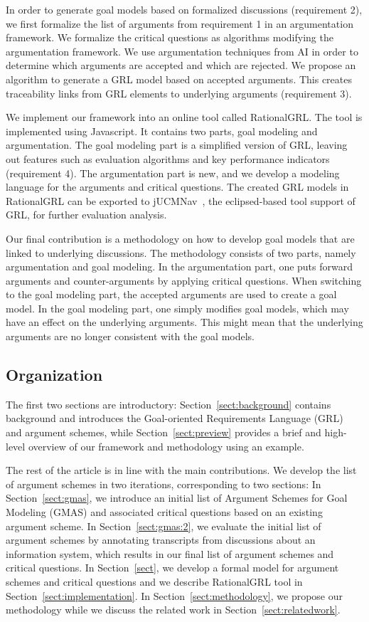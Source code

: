 \documentclass[11.5pt,two column]{llncs}
\begin{document}
In order to generate goal models based on formalized discussions (requirement 2), we first formalize the list of arguments from requirement 1 in an argumentation framework. We formalize the critical questions as algorithms modifying the argumentation framework. We use argumentation techniques from AI in order to determine which arguments are accepted and which are rejected. We propose an algorithm to generate a GRL model based on accepted arguments. This creates traceability links from GRL elements to underlying arguments (requirement 3).

We implement our framework into an online tool called RationalGRL. The tool is implemented using Javascript. It contains  two parts, goal modeling and argumentation. The goal modeling part is a simplified version of GRL, leaving out features such as evaluation algorithms and key performance indicators (requirement 4). The argumentation part is new, and we develop a modeling language for the arguments and critical questions. %
The created GRL models in RationalGRL can be exported to jUCMNav~\cite{}, the eclipsed-based tool support of GRL, for further evaluation analysis. 

Our final contribution is a methodology on how to develop goal models that are linked to underlying discussions. The methodology consists of two parts, namely argumentation and goal modeling. In the argumentation part, one puts forward arguments and counter-arguments by applying critical questions. When switching to the goal modeling part, the accepted arguments are used to create a goal model. In the goal modeling part, one simply modifies goal models, which may have an effect on the underlying arguments. This might mean that the underlying arguments are no longer consistent with the goal models.

\subsection{Organization}

The first two sections are introductory: Section~\ref{sect:background} contains background and introduces the Goal-oriented Requirements Language (GRL)~\cite{} and argument schemes, while Section~\ref{sect:preview} provides a brief and high-level overview of our framework and methodology using an example. 

The rest of the article is in line with the main contributions. We develop the list of argument schemes in two iterations, corresponding to two sections: In Section~\ref{sect:gmas}, we introduce an initial list of Argument Schemes for Goal Modeling (GMAS) and associated critical questions based on an existing argument scheme. In Section~\ref{sect:gmas:2}, we evaluate the initial list of argument schemes by annotating transcripts from discussions about an information system, which results in our final list of argument schemes and critical questions. In Section~\ref{sect}, we develop a formal model for argument schemes and critical questions and we describe RationalGRL tool in Section~\ref{sect:implementation}. In Section~\ref{sect:methodology}, we propose our methodology while we discuss the related work in Section~\ref{sect:relatedwork}.
\end{document}
